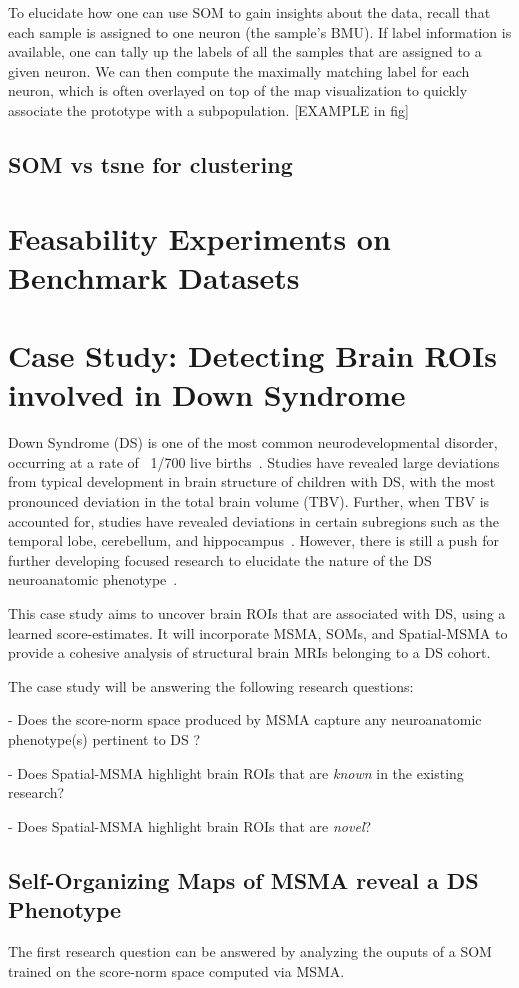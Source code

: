 To elucidate how one can use SOM to gain insights about the data, recall that each sample is assigned to one neuron (the sample's BMU). If label information is available, one can tally up the labels of all the samples that are assigned to a given neuron. We can then compute the maximally matching label for each neuron, which is often  overlayed on top of the map visualization to quickly associate the prototype with a subpopulation.
[EXAMPLE in fig]

\subsection*{SOM vs tsne for clustering}

\section{Feasability Experiments on Benchmark Datasets }

\section{Case Study: Detecting Brain ROIs involved in Down Syndrome}

Down Syndrome (DS) is one of the most common neurodevelopmental disorder, occurring at a rate of ~1/700 live births~\cite{parker2010updated}. Studies have revealed large deviations from typical development in brain structure of children with DS, with the most pronounced deviation in the total brain volume (TBV). Further, when TBV is accounted for, studies have revealed deviations in certain subregions such as the temporal lobe, cerebellum, and hippocampus~\cite{hamnerPediatricBrainDevelopment2018}. However, there is still a push for further developing focused research to elucidate the nature of the DS neuroanatomic phenotype~\cite{hamnerPediatricBrainDevelopment2018}.

This case study aims to uncover brain ROIs that are associated with DS, using a learned score-estimates. It will incorporate MSMA, SOMs, and Spatial-MSMA to provide a cohesive analysis of structural brain MRIs belonging to a DS cohort.

The case study will be answering the following research questions: 

	- Does the score-norm space produced by MSMA capture any neuroanatomic phenotype(s) pertinent to DS ?
 
	- Does Spatial-MSMA highlight brain ROIs that are \textit{known} in the existing research?

	- Does Spatial-MSMA highlight brain ROIs that are \textit{novel}?

\subsection*{Self-Organizing Maps of MSMA reveal a DS Phenotype}
The first research question can be answered by analyzing the ouputs of a SOM trained on the score-norm space computed via MSMA.



